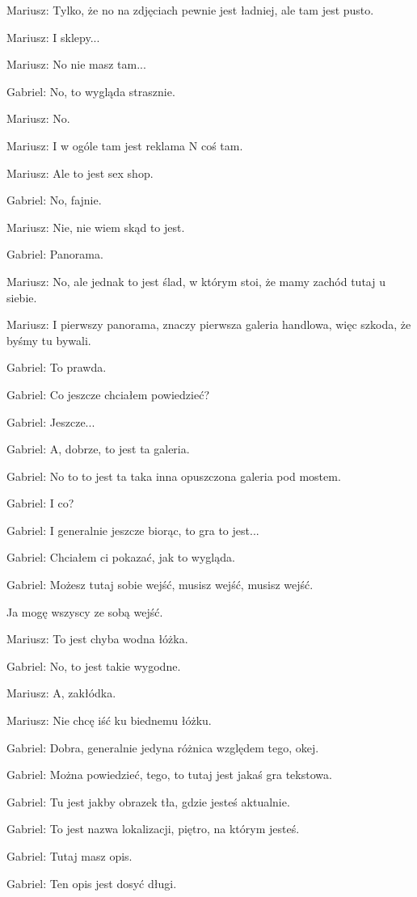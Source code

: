 Mariusz: Tylko, że no na zdjęciach pewnie jest ładniej, ale tam jest pusto.

Mariusz: I sklepy...

Mariusz: No nie masz tam...

Gabriel: No, to wygląda strasznie.

Mariusz: No.

Mariusz: I w ogóle tam jest reklama N coś tam.

Mariusz: Ale to jest sex shop.

Gabriel: No, fajnie.

Mariusz: Nie, nie wiem skąd to jest.

Gabriel: Panorama.

Mariusz: No, ale jednak to jest ślad, w którym stoi, że mamy zachód tutaj u siebie.

Mariusz: I pierwszy panorama, znaczy pierwsza galeria handlowa, więc szkoda, że byśmy tu bywali.

Gabriel: To prawda.

Gabriel: Co jeszcze chciałem powiedzieć?

Gabriel: Jeszcze...

Gabriel: A, dobrze, to jest ta galeria.

Gabriel: No to to jest ta taka inna opuszczona galeria pod mostem.

Gabriel: I co?

Gabriel: I generalnie jeszcze biorąc, to gra to jest...

Gabriel: Chciałem ci pokazać, jak to wygląda.

Gabriel: Możesz tutaj sobie wejść, musisz wejść, musisz wejść.

Ja mogę wszyscy ze sobą wejść.

Mariusz: To jest chyba wodna łóżka.

Gabriel: No, to jest takie wygodne.

Mariusz: A, zakłódka.

Mariusz: Nie chcę iść ku biednemu łóżku.

Gabriel: Dobra, generalnie jedyna różnica względem tego, okej.

Gabriel: Można powiedzieć, tego, to tutaj jest jakaś gra tekstowa.

Gabriel: Tu jest jakby obrazek tła, gdzie jesteś aktualnie.

Gabriel: To jest nazwa lokalizacji, piętro, na którym jesteś.

Gabriel: Tutaj masz opis.

Gabriel: Ten opis jest dosyć długi.

